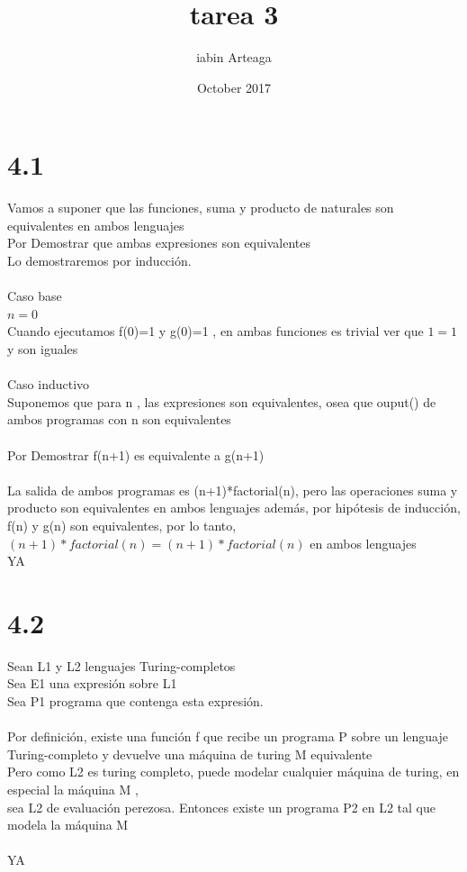 \documentclass{article}
\title{tarea 3}
\author{iabin Arteaga}
\date{October 2017}
\begin{document}
\maketitle

\section{4.1}
Vamos a suponer que las funciones, suma y producto de naturales son equivalentes en ambos lenguajes
\\Por Demostrar que ambas expresiones son equivalentes\\

Lo demostraremos por inducción.\\\\
Caso base
\\$n = 0$
\\Cuando ejecutamos f(0)=1 y g(0)=1 , en ambas funciones es trivial ver que $1 = 1$ y son iguales\\
\\
Caso inductivo\\
Suponemos que para n , las expresiones son equivalentes, osea que ouput() de ambos programas con n son equivalentes\\\\
Por Demostrar  f(n+1) es equivalente a g(n+1)\\
\\La salida de ambos programas es (n+1)*factorial(n), pero las operaciones suma y producto son equivalentes en ambos lenguajes
además, por hipótesis de inducción, f(n)  y g(n) son equivalentes, por lo tanto,  $(n+1)*factorial(n)= (n+1)*factorial(n)$ en ambos lenguajes
\\YA

\section{4.2}
Sean L1 y L2 lenguajes Turing-completos\\
Sea E1 una expresión sobre L1\\
Sea P1 programa que contenga esta expresión. \\\\

Por definición, existe una función f que recibe un programa P sobre un lenguaje Turing-completo y devuelve una máquina de turing M equivalente
\\Pero como L2 es turing completo, puede modelar cualquier máquina de turing, en especial la máquina M , \\sea L2 de evaluación perezosa.
Entonces existe un programa P2 en L2 tal que modela la máquina M\\\\
YA
\end{document}
